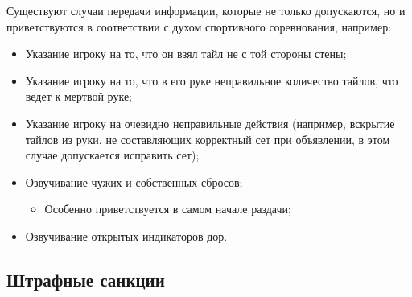 Существуют случаи передачи информации, которые не только допускаются, но и приветствуются в соответствии с духом спортивного соревнования, например:
\begin{itemize}
	\item Указание игроку на то, что он взял тайл не с той стороны стены;
	\item Указание игроку на то, что в его руке неправильное количество тайлов, что ведет к мертвой руке;
	\item Указание игроку на очевидно неправильные действия (например, вскрытие тайлов из руки, не составляющих корректный сет при объявлении, в этом случае допускается исправить сет);
	\item Озвучивание чужих и собственных сбросов;
	\begin{itemize}
		\item Особенно приветствуется в самом начале раздачи;
	\end{itemize}
	\item Озвучивание открытых индикаторов дор.
\end{itemize}

\subsection{Штрафные санкции}

